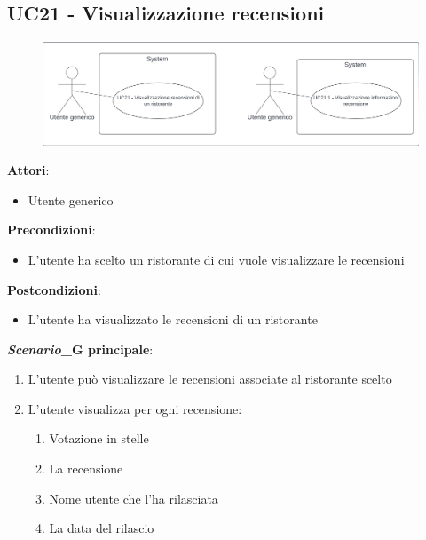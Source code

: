 \subsection{UC21 - Visualizzazione recensioni}\label{usecase:21}
\begin{figure}[H]
    \centering
    \includegraphics[width=0.9\linewidth]{ucd/ucd21.png}
\end{figure}
\textbf{Attori}:
\begin{itemize}
    \item Utente generico
\end{itemize}
\textbf{Precondizioni}:
\begin{itemize}
    \item L'utente ha scelto un ristorante di cui vuole visualizzare le recensioni
\end{itemize}
\textbf{Postcondizioni}:
\begin{itemize}
    \item L'utente ha visualizzato le recensioni di un ristorante
\end{itemize}
\textbf{\textit{Scenario}_G principale}:
\begin{enumerate}
    \item L'utente può visualizzare le recensioni associate al ristorante scelto
    \item L'utente visualizza per ogni recensione:
    \begin{enumerate}
        \item Votazione in stelle
        \item La recensione
        \item Nome utente che l'ha rilasciata
        \item La data del rilascio
    \end{enumerate}
\end{enumerate}

\newpage

